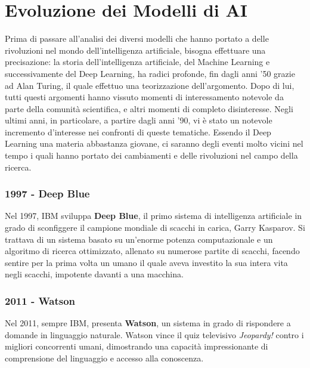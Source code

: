 \section{Evoluzione dei Modelli di AI}

Prima di passare all'analisi dei diversi modelli che hanno portato a delle rivoluzioni nel mondo dell'intelligenza artificiale, bisogna effettuare una precisazione: la storia dell'intelligenza artificiale, del Machine Learning e successivamente del Deep Learning, ha radici profonde, fin dagli anni '50 grazie ad Alan Turing, il quale effettuo una teorizzazione dell'argomento. Dopo di lui, tutti questi argomenti hanno vissuto momenti di interessamento notevole da parte della comunità scientifica, e altri momenti di completo disinteresse. Negli ultimi anni, in particolare, a partire dagli anni '90, vi è stato un notevole incremento d'interesse nei confronti di queste tematiche. Essendo il Deep Learning una materia abbastanza giovane, ci saranno degli eventi molto vicini nel tempo i quali hanno portato dei cambiamenti e delle rivoluzioni nel campo della ricerca.

\subsubsection{1997 - Deep Blue}

Nel 1997, IBM sviluppa \textbf{Deep Blue}, il primo sistema di intelligenza artificiale in grado di sconfiggere il campione mondiale di scacchi in carica, Garry Kasparov. Si trattava di un sistema basato su un’enorme potenza computazionale e un algoritmo di ricerca ottimizzato, allenato su numerose partite di scacchi, facendo sentire per la prima volta un umano il quale aveva investito la sua intera vita negli scacchi, impotente davanti a una macchina.

\subsubsection{2011 - Watson}

Nel 2011, sempre IBM, presenta \textbf{Watson}, un sistema in grado di rispondere a domande in linguaggio naturale. Watson vince il quiz televisivo \emph{Jeopardy!} contro i migliori concorrenti umani, dimostrando una capacità impressionante di comprensione del linguaggio e accesso alla conoscenza.

